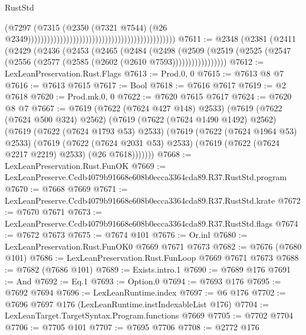 \begin{lexlean}{RustStd}
\begin{coremodule}
                                                                                        (@7297
                                                                                          (@7315
                                                                                            (@2350
                                                                                              (@7321
                                                                                                @7544)
                                                                                              (@26
                                                                                                @2349))))))))))))))))))))))))))))))))))))))))))))))
@7611 := @2348
    (@2381
      (@2411
        (@2429
          (@2436
            (@2453
              (@2465
                (@2484
                  (@2498
                    (@2509
                      (@2519 (@2525 (@2547 (@2556 (@2577 (@2585 (@2602 (@2610 @7593)))))))))))))))))
@7612 := LexLeanPreservation.Rust.Flags
@7613 := Prod.{0, 0}
@7615 := @7613 @8 @7
@7616 := @7613 @7615
@7617 := Bool
@7618 := @7616 @7617
@7619 := @2 @7618
@7620 := Prod.mk.{0, 0}
@7622 := @7620 @7615 @7617
@7624 := @7620 @8 @7
@7667 := @7619
    (@7622 (@7624 @427 @148) @2533)
    (@7619
      (@7622 (@7624 @500 @324) @2562)
      (@7619
        (@7622 (@7624 @1490 @1492) @2562)
        (@7619
          (@7622 (@7624 @1793 @53) @2533)
          (@7619
            (@7622 (@7624 @1964 @53) @2533)
            (@7619
              (@7622 (@7624 @2031 @53) @2533)
              (@7619 (@7622 (@7624 @2217 @2219) @2533) (@26 @7618)))))))
@7668 := LexLeanPreservation.Rust.FunOK
@7669 := LexLeanPreserve.Ccdb4079b91668e608b0ecca3364cda89.R37.RustStd.program
@7670 := @7668 @7669
@7671 := LexLeanPreserve.Ccdb4079b91668e608b0ecca3364cda89.R37.RustStd.krate
@7672 := @7670 @7671
@7673 := LexLeanPreserve.Ccdb4079b91668e608b0ecca3364cda89.R37.RustStd.flags
@7674 := @7672 @7673
@7675 := @7674 @101
@7676 := Or.inl
@7680 := LexLeanPreservation.Rust.FunOK0 @7669 @7671 @7673
@7682 := @7676 (@7680 @101)
@7686 := LexLeanPreservation.Rust.FunLoop @7669 @7671 @7673
@7688 := @7682 (@7686 @101)
@7689 := Exists.intro.{1}
@7690 := @7689 @176
@7691 := And
@7692 := Eq.{1}
@7693 := Option.{0}
@7694 := @7693 @176
@7695 := @7692 @7694
@7696 := LexLeanRuntime.index
@7697 := @6 @176
@7702 := @7696 @7697 @176 (LexLeanRuntime.instIndexableList @176)
@7704 := LexLeanTarget.TargetSyntax.Program.functions @7669
@7705 := @7702 @7704
@7706 := @7705 @101
@7707 := @7695 @7706
@7708 := @2772 @176

\end{coremodule}
\end{lexlean}
